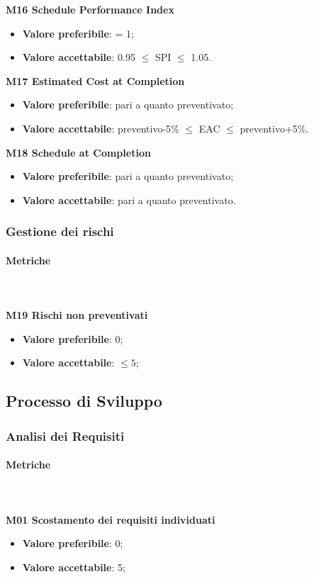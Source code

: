 				\textbf{M16 Schedule Performance Index}
				\begin{itemize}
					\item \textbf{Valore preferibile}: = 1;
					\item \textbf{Valore accettabile}: 0.95 $\le$ SPI $\le$ 1.05.
				\end{itemize}
				\textbf{M17 Estimated Cost at Completion}
				\begin{itemize}
					\item \textbf{Valore preferibile}: pari a quanto preventivato;
					\item \textbf{Valore accettabile}: preventivo-5\% $\le$ EAC $\le$ preventivo+5\%.
				\end{itemize}
				\textbf{M18 Schedule at Completion}
				\begin{itemize}
					\item \textbf{Valore preferibile}: pari a quanto preventivato;
					\item \textbf{Valore accettabile}: pari a quanto preventivato.
				\end{itemize}
			
		\subsubsection{Gestione dei rischi} 
			\paragraph{Metriche} \mbox{} \\ \\
			\textbf{M19 Rischi non preventivati} 
			\begin{itemize}
				\item \textbf{Valore preferibile}: 0;
				\item \textbf{Valore accettabile}: $ \le 5$;
			\end{itemize}
				
											
	\subsection{Processo di Sviluppo}
		\subsubsection{Analisi dei Requisiti} 
			\paragraph{Metriche} \mbox{} \\ \\
				\textbf{M01 Scostamento dei requisiti individuati} 
				\begin{itemize}
					\item \textbf{Valore preferibile}: 0;
					\item \textbf{Valore accettabile}: 5;
				\end{itemize}
			
